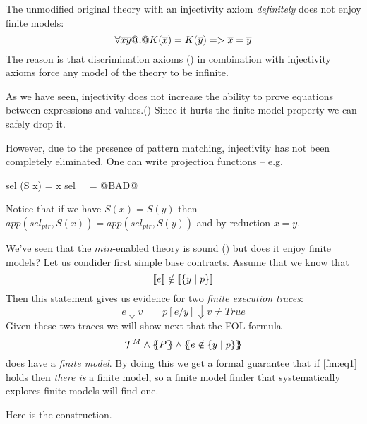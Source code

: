 \documentclass[preprint]{sigplanconf}
\begin{document}
The unmodified original theory with an injectivity axiom {\em definitely} does
not enjoy finite models:
\[   \forall \overline{x}\overline{y} @.@ K(\overline{x}) = K(\overline{y}) => \overline{x} = \overline{y} \]
The reason is that discrimination axioms () in
combination with injectivity axioms force any model of the theory to be infinite.

As we have seen, injectivity does not increase the ability to prove
equations between expressions and values.() Since it
hurts the finite model property we can safely drop it.

However, due to the presence of pattern matching, injectivity has not
been completely eliminated. One can write projection functions -- e.g.
\begin{code}
sel (S x) = x 
sel _     = @BAD@
\end{code}
Notice that if we have $S(x) = S(y)$ then 
$app(sel_{ptr},S(x)) = app(sel_{ptr},S(y))$ and by reduction $x = y$.

We've seen that the $min$-enabled theory is sound () 
but does it enjoy finite models? Let us condider first simple base contracts. 
Assume that we know that
\begin{equation}
  [\![e]\!] \notin [\![\{y \mid p\}]\!] \label{fm:eq1} 
\end{equation}
Then this statement gives us evidence for two {\em finite execution traces}:
\begin{equation}
   e \Downarrow v  \quad\quad p[e/y] \Downarrow v \neq True \label{fm:eq2} 
\end{equation}
Given these two traces we will show next that the FOL formula 
\[ \Th^M \land \ptrans{}{P} \land \ctrans{}{}{e \notin \{ y \mid p \}} \] 
does have a {\em finite model}. By doing this we get a formal guarantee that 
if \ref{fm:eq1} holds then {\em there is} a finite model, so a finite model finder 
that systematically explores finite models will find one.

Here is the construction. 
\end{document}
